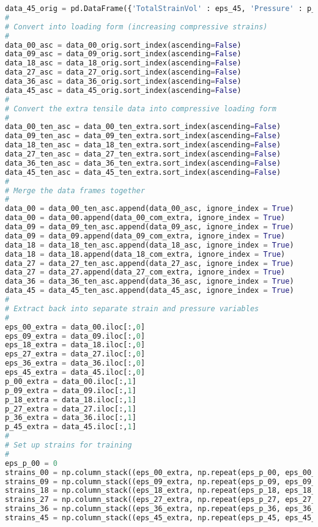 \begin{lstlisting}[language=Python]
data_45_orig = pd.DataFrame({'TotalStrainVol' : eps_45, 'Pressure' : p_45})
#
# Convert into loading form (increasing compressive strains)
#
data_00_asc = data_00_orig.sort_index(ascending=False)
data_09_asc = data_09_orig.sort_index(ascending=False)
data_18_asc = data_18_orig.sort_index(ascending=False)
data_27_asc = data_27_orig.sort_index(ascending=False)
data_36_asc = data_36_orig.sort_index(ascending=False)
data_45_asc = data_45_orig.sort_index(ascending=False)
#
# Convert the extra tensile data into compressive loading form
#
data_00_ten_asc = data_00_ten_extra.sort_index(ascending=False)
data_09_ten_asc = data_09_ten_extra.sort_index(ascending=False)
data_18_ten_asc = data_18_ten_extra.sort_index(ascending=False)
data_27_ten_asc = data_27_ten_extra.sort_index(ascending=False)
data_36_ten_asc = data_36_ten_extra.sort_index(ascending=False)
data_45_ten_asc = data_45_ten_extra.sort_index(ascending=False)
#
# Merge the data frames together
#
data_00 = data_00_ten_asc.append(data_00_asc, ignore_index = True)
data_00 = data_00.append(data_00_com_extra, ignore_index = True)
data_09 = data_09_ten_asc.append(data_09_asc, ignore_index = True)
data_09 = data_09.append(data_09_com_extra, ignore_index = True)
data_18 = data_18_ten_asc.append(data_18_asc, ignore_index = True)
data_18 = data_18.append(data_18_com_extra, ignore_index = True)
data_27 = data_27_ten_asc.append(data_27_asc, ignore_index = True)
data_27 = data_27.append(data_27_com_extra, ignore_index = True)
data_36 = data_36_ten_asc.append(data_36_asc, ignore_index = True)
data_45 = data_45_ten_asc.append(data_45_asc, ignore_index = True)
#
# Extract back into separate strain and pressure variables
#
eps_00_extra = data_00.iloc[:,0]
eps_09_extra = data_09.iloc[:,0]
eps_18_extra = data_18.iloc[:,0]
eps_27_extra = data_27.iloc[:,0]
eps_36_extra = data_36.iloc[:,0]
eps_45_extra = data_45.iloc[:,0]
p_00_extra = data_00.iloc[:,1]
p_09_extra = data_09.iloc[:,1]
p_18_extra = data_18.iloc[:,1]
p_27_extra = data_27.iloc[:,1]
p_36_extra = data_36.iloc[:,1]
p_45_extra = data_45.iloc[:,1]
#
# Set up strains for training 
#
eps_p_00 = 0
strains_00 = np.column_stack((eps_00_extra, np.repeat(eps_p_00, eps_00_extra.shape[0])))
strains_09 = np.column_stack((eps_09_extra, np.repeat(eps_p_09, eps_09_extra.shape[0])))
strains_18 = np.column_stack((eps_18_extra, np.repeat(eps_p_18, eps_18_extra.shape[0])))
strains_27 = np.column_stack((eps_27_extra, np.repeat(eps_p_27, eps_27_extra.shape[0])))
strains_36 = np.column_stack((eps_36_extra, np.repeat(eps_p_36, eps_36_extra.shape[0])))
strains_45 = np.column_stack((eps_45_extra, np.repeat(eps_p_45, eps_45_extra.shape[0])))

\end{lstlisting}
